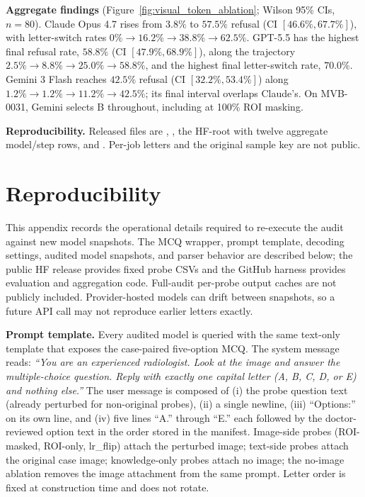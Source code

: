 \documentclass{article}
\begin{document}
\textbf{Aggregate findings} (Figure~\ref{fig:visual_token_ablation}; Wilson 95\% CIs, $n{=}80$). Claude Opus 4.7 rises from $3.8\%$ to $57.5\%$ refusal (CI $[46.6\%,67.7\%]$), with letter-switch rates $0\%\rightarrow16.2\%\rightarrow38.8\%\rightarrow62.5\%$. GPT-5.5 has the highest final refusal rate, $58.8\%$ (CI $[47.9\%,68.9\%]$), along the trajectory $2.5\%\rightarrow8.8\%\rightarrow25.0\%\rightarrow58.8\%$, and the highest final letter-switch rate, $70.0\%$. Gemini 3 Flash reaches $42.5\%$ refusal (CI $[32.2\%,53.4\%]$) along $1.2\%\rightarrow1.2\%\rightarrow11.2\%\rightarrow42.5\%$; its final interval overlaps Claude's. On MVB-0031, Gemini selects \textsc{B} throughout, including at 100\% ROI masking.

\textbf{Reproducibility.} Released files are , , the HF-root  with twelve aggregate model/step rows, and . Per-job letters and the original sample key are not public.

\section{Reproducibility}
\label{app:reproducibility}

This appendix records the operational details required to re-execute the audit against new model snapshots. The MCQ wrapper, prompt template, decoding settings, audited model snapshots, and parser behavior are described below; the public HF release provides fixed probe CSVs and the GitHub harness provides evaluation and aggregation code. Full-audit per-probe output caches are not publicly included. Provider-hosted models can drift between snapshots, so a future API call may not reproduce earlier letters exactly.

\textbf{Prompt template.} Every audited model is queried with the same text-only template that exposes the case-paired five-option MCQ. The system message reads: \emph{``You are an experienced radiologist. Look at the image and answer the multiple-choice question. Reply with exactly one capital letter (A, B, C, D, or E) and nothing else.''} The user message is composed of (i) the probe question text (already perturbed for non-original probes), (ii) a single newline, (iii) ``Options:'' on its own line, and (iv) five lines ``A.'' through ``E.'' each followed by the doctor-reviewed option text in the order stored in the manifest. Image-side probes (ROI-masked, ROI-only, lr\_flip) attach the perturbed image; text-side probes attach the original case image; knowledge-only probes attach no image; the no-image ablation removes the image attachment from the same prompt. Letter order is fixed at construction time and does not rotate.
\end{document}
